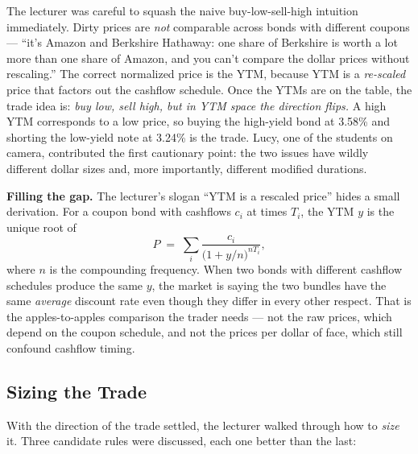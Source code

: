 The lecturer was careful to squash the naive buy-low-sell-high intuition
immediately. Dirty prices are \emph{not} comparable across bonds with
different coupons --- ``it's Amazon and Berkshire Hathaway: one share of
Berkshire is worth a lot more than one share of Amazon, and you can't
compare the dollar prices without rescaling.'' The correct normalized price
is the YTM, because YTM is a \emph{re-scaled} price that factors out the
cashflow schedule. Once the YTMs are on the table, the trade idea is:
\emph{buy low, sell high, but in YTM space the direction flips.} A high YTM
corresponds to a low price, so buying the high-yield bond at
3.58\% and shorting the low-yield note at 3.24\% is the
trade. Lucy, one of the students on camera, contributed the first cautionary
point: the two issues have wildly different dollar sizes and, more
importantly, different modified durations.

\begin{tipblock}
\textbf{Filling the gap.} The lecturer's slogan ``YTM is a rescaled price''
hides a small derivation. For a coupon bond with cashflows $c_i$ at times
$T_i$, the YTM $y$ is the unique root of
\[
  P \;=\; \sum_i \frac{c_i}{\bigl(1+y/n\bigr)^{n T_i}},
\]
where $n$ is the compounding frequency. When two bonds with different
cashflow schedules produce the same $y$, the market is saying the two
bundles have the same \emph{average} discount rate even though they differ
in every other respect. That is the apples-to-apples comparison the trader
needs --- not the raw prices, which depend on the coupon schedule, and not
the prices per dollar of face, which still confound cashflow timing.
\end{tipblock}

\subsection{Sizing the Trade}\label{L3-sec:case-size}

With the direction of the trade settled, the lecturer walked through how to
\emph{size} it. Three candidate rules were discussed, each one better than
the last:

